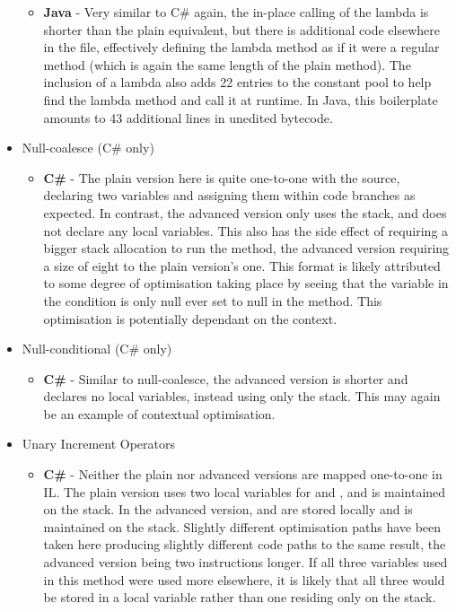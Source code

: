 \documentclass{article}
\begin{document}
\begin{itemize}
\begin{itemize}
                \item \textbf{Java} - Very similar to C\# again, the in-place calling of the lambda is shorter than the plain equivalent, but there is additional code elsewhere in the file, effectively defining the lambda method as if it were a regular method (which is again the same length of the plain method). The inclusion of a lambda also adds 22 entries to the constant pool to help find the lambda method and call it at runtime. In Java, this boilerplate amounts to 43 additional lines in unedited bytecode.
            \end{itemize}
            \item Null-coalesce (C\# only)
            \begin{itemize}
                \item \textbf{C\#} - The plain version here is quite one-to-one with the source, declaring two  variables and assigning them within code branches as expected. In contrast, the advanced version only uses the stack, and does not declare any local variables. This also has the side effect of requiring a bigger stack allocation to run the method, the advanced version requiring a size of eight to the plain version's one. This format is likely attributed to some degree of optimisation taking place by seeing that the variable in the condition is only null ever set to null in the method. This optimisation is potentially dependant on the context.
            \end{itemize}
            \item Null-conditional (C\# only)
            \begin{itemize}
                \item \textbf{C\#} - Similar to null-coalesce, the advanced version is shorter and declares no local variables, instead using only the stack. This may again be an example of contextual optimisation.
            \end{itemize}
            \item Unary Increment Operators
            \begin{itemize}
                \item \textbf{C\#} - Neither the plain nor advanced versions are mapped one-to-one in IL. The plain version uses two local variables for  and , and  is maintained on the stack. In the advanced version,  and  are stored locally and  is maintained on the stack. Slightly different optimisation paths have been taken here producing slightly different code paths to the same result, the advanced version being two instructions longer. If all three variables used in this method were used more elsewhere, it is likely that all three would be stored in a local variable rather than one residing only on the stack.

\end{itemize}
\end{itemize}
\end{document}
